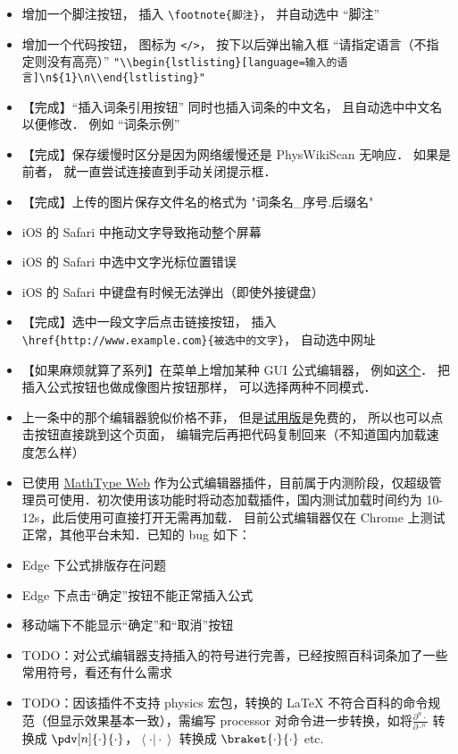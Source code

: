\begin{itemize}
\item 增加一个脚注按钮， 插入 \lstinline|\footnote{脚注}|， 并自动选中 “脚注”

\item 增加一个代码按钮， 图标为 \lstinline|</>|， 按下以后弹出输入框 “请指定语言（不指定则没有高亮）” \lstinline|"\\begin{lstlisting}[language=输入的语言]\n${1}\n\\end{lstlisting}"|

\item 【完成】“插入词条引用按钮” 同时也插入词条的中文名， 且自动选中中文名以便修改． 例如 “词条示例”

\item 【完成】保存缓慢时区分是因为网络缓慢还是 PhysWikiScan 无响应． 如果是前者， 就一直尝试连接直到手动关闭提示框．

\item 【完成】上传的图片保存文件名的格式为 "词条名_序号.后缀名"

\item iOS 的 Safari 中拖动文字导致拖动整个屏幕

\item iOS 的 Safari 中选中文字光标位置错误

\item iOS 的 Safari 中键盘有时候无法弹出（即使外接键盘）

\item 【完成】选中一段文字后点击链接按钮， 插入 \lstinline|\href{http://www.example.com}{被选中的文字}|， 自动选中网址

\item 【如果麻烦就算了系列】在菜单上增加某种 GUI 公式编辑器， 例如\href{http://latex.codecogs.com/eqneditor/editor.php}{这个}． 把插入公式按钮也做成像图片按钮那样， 可以选择两种不同模式．

\item 上一条中的那个编辑器貌似价格不菲， 但是\href{https://www.codecogs.com/latex/eqneditor.php?lang=zh-cn}{试用版}是免费的， 所以也可以点击按钮直接跳到这个页面， 编辑完后再把代码复制回来（不知道国内加载速度怎么样）

\item 已使用 \href{http://www.wiris.net/client/editor/resources/help.html?v=7.9.0.6564}{MathType Web} 作为公式编辑器插件，目前属于内测阶段，仅超级管理员可使用．初次使用该功能时将动态加载插件，国内测试加载时间约为 10-12s，此后使用可直接打开无需再加载．
目前公式编辑器仅在 Chrome 上测试正常，其他平台未知．已知的 bug 如下：
\item Edge 下公式排版存在问题
\item Edge 下点击“确定”按钮不能正常插入公式
\item 移动端下不能显示“确定”和“取消”按钮
\item TODO：对公式编辑器支持插入的符号进行完善，已经按照百科词条加了一些常用符号，看还有什么需求
\item TODO：因该插件不支持 physics 宏包，转换的 LaTeX 不符合百科的命令规范（但显示效果基本一致），需编写 processor 对命令进一步转换，如将$\frac{\partial^{n}{\cdot}}{\partial{\cdot}^{n}}$ 转换成 $\pdv[n]{\cdot}{\cdot}$，$\left\langle{\cdot}\vert{\cdot}\right\rangle$ 转换成 $\braket{\cdot}{\cdot}$ etc.


\end{itemize}
